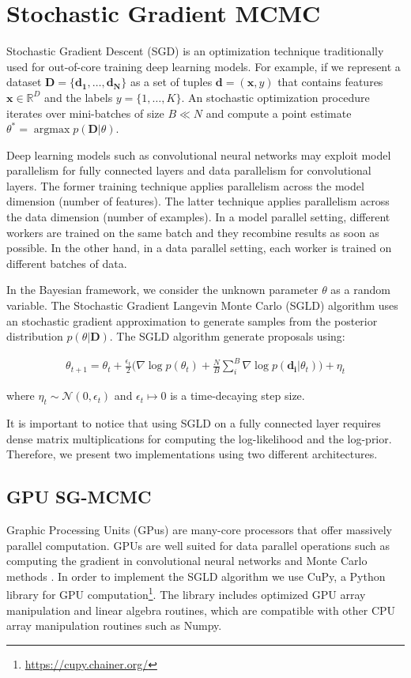 \documentclass[9pt,lineno]{crone}
\begin{document}
\section{Stochastic Gradient MCMC}
Stochastic Gradient Descent (SGD) is an optimization technique traditionally used for out-of-core training deep learning models. For example, if we represent a dataset $\mathbf{D}=\{\mathbf{d_1},\ldots,\mathbf{d_N}\}$ as a set of tuples $\mathbf{d}=(\mathbf x,y)$ that contains features $\mathbf x \in \mathbb R^D$ and the labels $y=\{1,\ldots,K\}$. An stochastic optimization procedure iterates  over mini-batches of size $B \ll N$ and compute a point estimate $\theta^\ast = \operatorname{argmax} p(\mathbf{D} \vert \theta)$.

Deep learning models such as convolutional neural networks may exploit model parallelism for fully connected layers and data parallelism for convolutional layers. The former training technique applies parallelism across the model dimension (number of features). The latter technique applies parallelism across the data dimension (number of examples). In a model parallel setting, different workers are trained on the same batch and they recombine results as soon as possible. In the other hand, in a data parallel setting, each worker is trained on different batches of data. 

In the Bayesian framework, we consider the unknown parameter $\theta$ as a random variable. The Stochastic Gradient Langevin Monte Carlo (SGLD) algorithm uses an stochastic gradient approximation to generate samples from the posterior distribution $p(\theta \vert \mathbf{D})$. The SGLD algorithm generate proposals using:

\begin{align}
\theta_{t+1}=\theta_{t}+\frac{\epsilon_t}{2}\Big(\nabla\operatorname{log}p(\theta_{t})+\frac{N}{B} \sum_i^B \nabla \operatorname{log} p(\mathbf{d_i} \vert \theta_{t})\Big) + \eta_t
\label{eq:sgld}
\end{align}

where $\eta_t \sim \mathcal N(0,\epsilon_t)$ and $\epsilon_t \mapsto 0$ is a time-decaying step size.

It is important to notice that using SGLD on a fully connected layer requires dense matrix multiplications for computing the log-likelihood and the log-prior. Therefore, we present two implementations using two different architectures.  
    
\subsection{GPU SG-MCMC}
Graphic Processing Units (GPus) are many-core processors that offer massively parallel computation. GPUs are well suited for data parallel operations such as computing the gradient in convolutional neural networks and Monte Carlo methods \cite{lee2010utility}. In order to implement the SGLD algorithm we use CuPy, a Python library for GPU computation\footnote{\url{https://cupy.chainer.org/}}. The library includes optimized GPU array manipulation and linear algebra routines, which are compatible with other CPU array manipulation routines such as Numpy. 
 
\end{document}
